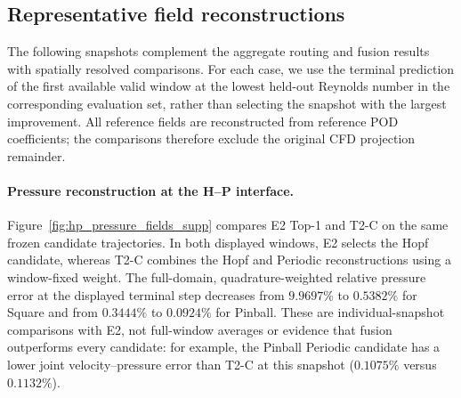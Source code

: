 
\subsection{Representative field reconstructions}
\label{app:representative_fields_crosscase}

The following snapshots complement the aggregate routing and fusion
results with spatially resolved comparisons. For each case, we use the
terminal prediction of the first available valid window at the lowest
held-out Reynolds number in the corresponding evaluation set, rather
than selecting the snapshot with the largest improvement. All reference
fields are reconstructed from reference POD coefficients; the comparisons
therefore exclude the original CFD projection remainder.

\paragraph{Pressure reconstruction at the H--P interface.}
Figure~\ref{fig:hp_pressure_fields_supp} compares E2 Top-1 and T2-C on
the same frozen candidate trajectories. In both displayed windows,
E2 selects the Hopf candidate, whereas T2-C combines the Hopf and
Periodic reconstructions using a window-fixed weight. The full-domain,
quadrature-weighted relative pressure error at the displayed terminal
step decreases from $9.9697\%$ to $0.5382\%$ for Square and from
$0.3444\%$ to $0.0924\%$ for Pinball. These are individual-snapshot
comparisons with E2, not full-window averages or evidence that fusion
outperforms every candidate: for example, the Pinball Periodic candidate
has a lower joint velocity--pressure error than T2-C at this snapshot
($0.1075\%$ versus $0.1132\%$).

